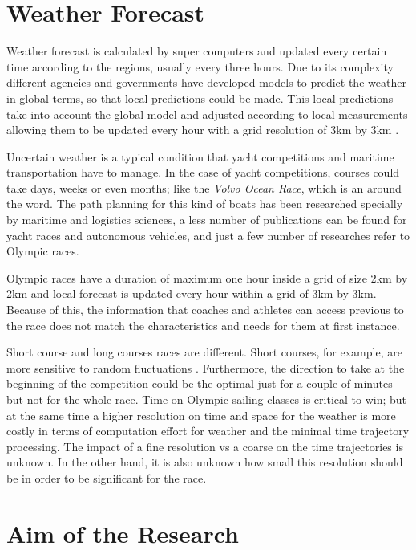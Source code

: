 \section{Weather Forecast}
Weather forecast is calculated by super computers and updated every certain time according to the regions, usually every three hours. Due to its complexity different agencies and governments have developed models to predict the weather in global terms, so that local predictions could be made. This local predictions take into account the global model and adjusted according to local measurements allowing them to be updated every hour with a grid resolution of 3km by 3km \cite{warner2010numerical}. \par

Uncertain weather is a typical condition that yacht competitions and maritime transportation have to manage. In the case of yacht competitions, courses could take days, weeks or even months; like the \textit{Volvo Ocean Race}, which is an around the word. The path planning for this kind of boats has been researched specially by maritime and logistics sciences, a less number of publications can be found for yacht races and autonomous vehicles, and just a few number of researches refer to Olympic races. \par  

 Olympic races have a duration of maximum one hour inside a grid of size 2km by 2km and local forecast is updated every hour within a grid of 3km by 3km. Because of this, the information that coaches and athletes can access previous to the race does not match the characteristics and needs for them at first instance.\par 
 
 Short course and long courses races are different. Short courses, for example, are more sensitive to random fluctuations \cite{philpott2001optimising}. Furthermore, the direction to take at the beginning of the competition could be the optimal just for a couple of minutes but not for the whole race. Time on Olympic sailing classes is critical to win; but at the same time a higher resolution on time and space for the weather is more costly in terms of computation effort for weather and the minimal time trajectory processing. The impact of a fine resolution vs a coarse on the time trajectories is unknown. In the other hand, it is also unknown how small this resolution should be in order to be significant for the  race.\par 
 
 \section{Aim of the Research}
 
